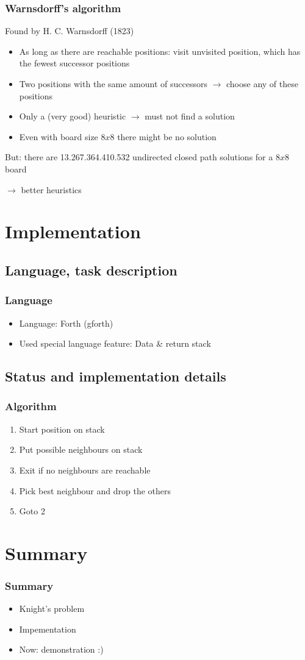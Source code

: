 \documentclass{beamer}
\begin{document}
\begin{frame}
\frametitle{Warnsdorff's algorithm}
Found by H. C. Warnsdorff (1823)\par
\begin{itemize}
	\item As long as there are reachable positions: visit unvisited position,
	which has the fewest successor positions
	\item Two positions with the same amount of successors $\rightarrow$
	choose any of these positions
	\item Only a (very good) heuristic $\rightarrow$ must not find a solution
	\item Even with board size $8x8$ there might be no solution
\end{itemize}

But: there are 13.267.364.410.532 undirected closed path solutions for a $8x8$ board

 $\rightarrow$ better heuristics 

\end{frame}

\section{Implementation}
\subsection{Language, task description}
\begin{frame}
\frametitle{Language}
\begin{itemize}
	\item Language: Forth (gforth)
	\item Used special language feature: Data & return stack
\end{itemize}
\end{frame}

\subsection{Status and implementation details}
\begin{frame}
\frametitle{Algorithm}
\begin{enumerate}
	\item Start position on stack
	\item Put possible neighbours on stack
	\item Exit if no neighbours are reachable
	\item Pick best neighbour and drop the others
	\item Goto 2
\end{enumerate}
\end{frame}

\section{Summary}
\begin{frame}
\frametitle{Summary}
\begin{itemize}
	\item Knight's problem
	\item Impementation
	\item Now: demonstration :)
\end{itemize}
\end{frame}
\end{document}
